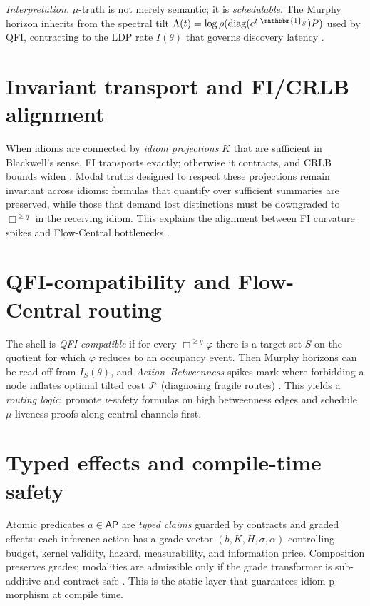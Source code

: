 \documentclass[11pt]{article}
\theoremstyle{plain}
\theoremstyle{definition}
\theoremstyle{remark}
\newcommand{\1}{\mathbbm{1}}
\begin{document}
\noindent\emph{Interpretation.} $\mu$-truth is not merely semantic; it is \emph{schedulable}. The Murphy horizon inherits from the spectral tilt $\Lambda(t)=\log\rho(\mathrm{diag}(e^{t\cdot \1_S})P)$ used by QFI, contracting to the LDP rate $I(\theta)$ that governs discovery latency \parencite{elliott2025qfi,DemboZeitouni1998}.

\section{Invariant transport and FI/CRLB alignment}\label{sec:transport}
When idioms are connected by \emph{idiom projections} $K$ that are sufficient in Blackwell’s sense, FI transports exactly; otherwise it contracts, and CRLB bounds widen \parencite{Blackwell1953,AmariNagaoka2000,Cencov1982,CoverThomas2006,elliott2025idiom}. Modal truths designed to respect these projections remain invariant across idioms: formulas that quantify over sufficient summaries are preserved, while those that demand lost distinctions must be downgraded to $\Box^{\ge q}$ in the receiving idiom. This explains the alignment between FI curvature spikes and Flow-Central bottlenecks \parencite{elliott2025flow}.

\section{QFI-compatibility and Flow-Central routing}\label{sec:qfi}
The shell is \emph{QFI-compatible} if for every $\Box^{\ge q}\varphi$ there is a target set $S$ on the quotient for which $\varphi$ reduces to an occupancy event. Then Murphy horizons can be read off from $I_S(\theta)$, and \emph{Action--Betweenness} spikes mark where forbidding a node inflates optimal tilted cost $J^\star$ (diagnosing fragile routes) \parencite{elliott2025qfi,elliott2025flow}. This yields a \emph{routing logic}: promote $\nu$-safety formulas on high betweenness edges and schedule $\mu$-liveness proofs along central channels first.

\section{Typed effects and compile-time safety}\label{sec:types}
Atomic predicates $a\in\mathsf{AP}$ are \emph{typed claims} guarded by contracts and graded effects: each inference action has a grade vector $(b,K,H,\sigma,\alpha)$ controlling budget, kernel validity, hazard, measurability, and information price. Composition preserves grades; modalities are admissible only if the grade transformer is sub-additive and contract-safe \parencite{elliott2025contracts,elliott2025graded}. This is the static layer that guarantees idiom p-morphism at compile time.
\end{document}
